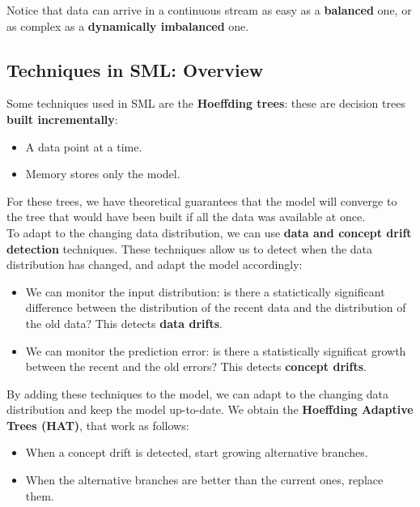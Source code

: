 Notice that data can arrive in a continuous stream as easy as a \textbf{balanced} one, 
or as complex as a \textbf{dynamically imbalanced} one.\\

\subsection{Techniques in SML: Overview}

Some techniques used in SML are the \textbf{Hoeffding trees}: these are decision trees
\textbf{built incrementally}:

\begin{itemize}
    \item A data point at a time.
    \item Memory stores only the model.
\end{itemize}

For these trees, we have theoretical guarantees that the model will converge to the
tree that would have been built if all the data was available at once.\\

To adapt to the changing data distribution, we can use \textbf{data and concept drift detection}
techniques. These techniques allow us to detect when the data distribution has changed,
and adapt the model accordingly:
\begin{itemize}
    \item We can monitor the input distribution: is there a statictically significant 
    difference between the distribution of the recent data and the distribution of the
    old data? This detects \textbf{data drifts}.

    \item We can monitor the prediction error: is there a statistically significat growth
    between the recent and the old errors? This detects \textbf{concept drifts}.
\end{itemize}

By adding these techniques to the model, we can adapt to the changing data distribution
and keep the model up-to-date. We obtain the \textbf{Hoeffding Adaptive Trees (HAT)}, 
that work as follows:
\begin{itemize}
    \item When a concept drift is detected, start growing alternative branches.
    \item When the alternative branches are better than the current ones, replace them.
\end{itemize}


